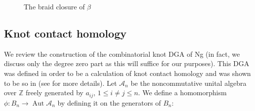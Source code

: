 \documentclass[11pt]{amsart}
\def\Z{{\mathbb Z}}
\def\A{{\mathcal A}}
\newcommand\Aut{\operatorname{Aut}}
\theoremstyle{definition}
\begin{document}
    \begin{figure}[ht]
      \caption{The braid closure of $\beta$}
      \label{fig:BClosure}
    \end{figure}

\subsection{Knot contact homology}
\label{SecBG_KCHdef}

  We review the construction of the combinatorial knot DGA of Ng (in fact, we discuss only the degree zero part as this will suffice for our purposes). This DGA was defined in order to be a calculation of knot contact homology and was shown to be so in \cite{EENS12} (see \cite{Ng12} for more details). Let $\A_n$ be the noncommutative unital algebra over $\Z$ freely generated by $a_{ij}$, $1\le i\ne j\le n$. We define a homomorphism $\phi : B_n \rightarrow\Aut \A_n$ by defining it on the generators of $B_n$:
\end{document}
